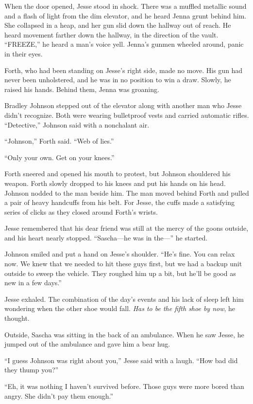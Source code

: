 \documentclass[12pt]{book}
\begin{document}
When the door opened, Jesse stood in shock.  There was a muffled metallic sound and a flash of light from the dim elevator, and he heard Jenna grunt behind him.  She collapsed in a heap, and her gun slid down the hallway out of reach.  He heard movement farther down the hallway, in the direction of the vault.  ``FREEZE,'' he heard a man's voice yell.  Jenna's gunmen wheeled around, panic in their eyes.

Forth, who had been standing on Jesse's right side, made no move.  His gun had never been unholstered, and he was in no position to win a draw.  Slowly, he raised his hands.  Behind them, Jenna was groaning.

Bradley Johnson stepped out of the elevator along with another man who Jesse didn't recognize.  Both were wearing bulletproof vests and carried automatic rifles.  ``Detective,'' Johnson said with a nonchalant air.

``Johnson,'' Forth said.  ``Web of lies.''

``Only your own.  Get on your knees.''

Forth sneered and opened his mouth to protest, but Johnson shouldered his weapon.  Forth slowly dropped to his knees and put his hands on his head.  Johnson nodded to the man beside him.  The man moved behind Forth and pulled a pair of heavy handcuffs from his belt.  For Jesse, the cuffs made a satisfying series of clicks as they closed around Forth's wrists.

Jesse remembered that his dear friend was still at the mercy of the goons outside, and his heart nearly stopped.  ``Sascha---he was in the---'' he started.

Johnson smiled and put a hand on Jesse's shoulder.  ``He's fine.  You can relax now.  We knew that we needed to hit these guys first, but we had a backup unit outside to sweep the vehicle.  They roughed him up a bit, but he'll be good as new in a few days.''

Jesse exhaled.  The combination of the day's events and his lack of sleep left him wondering when the other shoe would fall.  \emph{Has to be the fifth shoe by now}, he thought.

Outside, Sascha was sitting in the back of an ambulance.  When he saw Jesse, he jumped out of the ambulance and gave him a bear hug.

``I guess Johnson was right about you,'' Jesse said with a laugh.  ``How bad did they thump you?''

``Eh, it was nothing I haven't survived before.  Those guys were more bored than angry.  She didn't pay them enough.''
\end{document}
